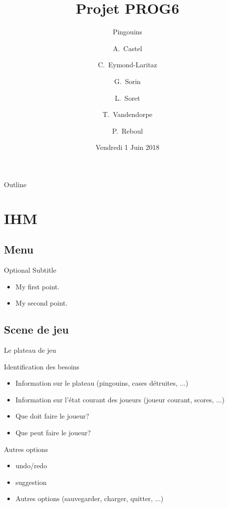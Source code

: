 \documentclass{beamer}
\title{Projet PROG6}
\subtitle{Pingouins}
\author{A.~Castel \and C.~Eymond-Laritaz \and G.~Sorin \and L.~Soret \and T.~Vandendorpe \and P.~Reboul}
\institute[Université Grenoble-Alpes] %
{
  UFR IM²AG\\
  Université Grenoble-Alpes
}
\date{Vendredi 1 Juin 2018}
\begin{document}
\begin{frame}
  \titlepage
\end{frame}

\begin{frame}{Outline}
  \tableofcontents
\end{frame}

\section{IHM}

\subsection{Menu}

\begin{frame}{}{Optional Subtitle}
  \begin{itemize}
  \item {
    My first point.
  }
  \item {
    My second point.
  }
  \end{itemize}
\end{frame}

\subsection{Scene de jeu}

\begin{frame}{Le plateau de jeu}
  \begin{block}{Identification des besoins}
    \begin{itemize}
    \item <1-> Information sur le plateau (pingouins, cases détruites, ...)
    \item <2-> Information sur l'état courant des joueurs (joueur courant, scores, ...)
    \item <3-> Que doit faire le joueur?
    \item <4-> Que peut faire le joueur?
    \end{itemize}
  \end{block}
\end{frame}

\begin{frame}{}
  \begin{block}{Autres options}
    \begin{itemize}
    \item <1-> undo/redo
    \item <2-> suggestion
    \item <3-> Autres options (sauvegarder, charger, quitter, ...)
    \end{itemize}
  \end{block}
\end{frame}
\end{document}
